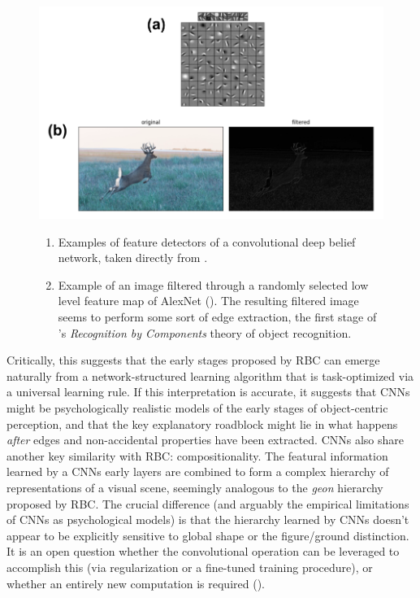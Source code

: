 \documentclass[12pt]{article}
\let\oldcite=\cite
\let\oldtextcite=\textcite
\renewcommand{\cite}[1]{\textcolor[rgb]{0, .121, .388}{\oldcite{#1}}}
\renewcommand{\textcite}[1]{\textcolor[rgb]{0, .121, .388}{\oldtextcite{#1}}}
\begin{document}
\begin{figure}[!h]
    \centering
    \includegraphics[scale=.4]{figures/CNNs_doing_rbc.png}
    \caption{}
        \begin{enumerate}[label=(\alph*)]
            \item Examples of feature detectors of a convolutional deep belief network, taken directly from \textcite{lee2009convolutional}. 
            \item Example of an image filtered through a randomly selected low level feature map of AlexNet (\cite{krizhevsky2012imagenet}). The resulting filtered image seems to perform some sort of edge extraction, the first stage of \textcite{biederman1987recognition}'s \emph{Recognition by Components} theory of object recognition.
        \end{enumerate}
    \label{fig:CNNs_doing_rbc}
\end{figure} 

Critically, this suggests that the early stages proposed by RBC can emerge
naturally from a network-structured learning algorithm that is task-optimized
via a universal learning rule. If this interpretation is accurate, it suggests
that CNNs might be psychologically realistic models of the early stages of
object-centric perception, and that the key explanatory roadblock might lie in
what happens \emph{after} edges and non-accidental properties have been
extracted. CNNs also share another key similarity with RBC: compositionality.
The featural information learned by a CNNs early layers are combined to form a
complex hierarchy of representations of a visual scene, seemingly analogous to
the \emph{geon} hierarchy proposed by RBC. The crucial difference (and arguably
the empirical limitations of CNNs as psychological models) is that the hierarchy learned by CNNs doesn't appear to be explicitly sensitive to global shape or the figure/ground distinction. It is an open question whether the convolutional operation can be leveraged to accomplish this (via regularization or a fine-tuned training procedure), or whether an entirely new computation is required (\cite{hinton2011transforming,sabour2017dynamic}).
\end{document}
